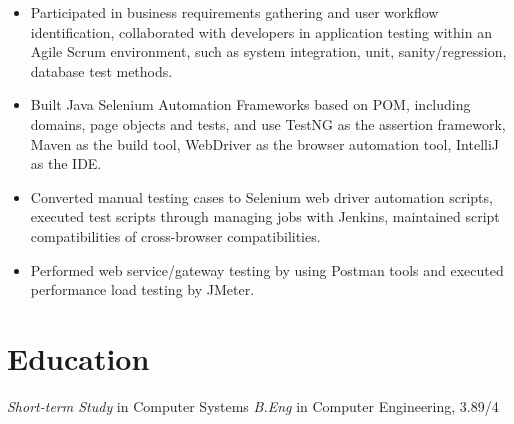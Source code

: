 \documentclass{resume}
\begin{document}
\begin{itemize}
  \item Participated in business requirements gathering and user workflow identification, collaborated with developers in application testing within an Agile Scrum environment, such as system integration, unit, sanity/regression, database test methods.
  \item Built Java Selenium Automation Frameworks based on POM, including domains, page objects and tests, and use TestNG as the assertion framework, Maven as the build tool, WebDriver as the browser automation tool, IntelliJ as the IDE.
  \item Converted manual testing cases to Selenium web driver automation scripts, executed test scripts through managing jobs with Jenkins, maintained script compatibilities of cross-browser compatibilities.
  \item Performed web service/gateway testing by using Postman tools and executed performance load testing by JMeter.
\end{itemize}



\section{Education}
\textit{Short-term Study} in Computer Systems
\textit{B.Eng} in Computer Engineering, 3.89/4


%
%
\end{document}
